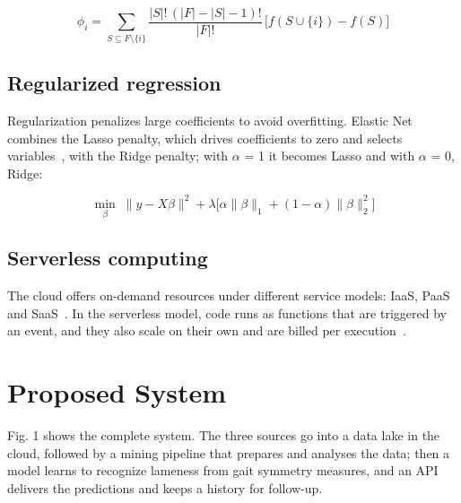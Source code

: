 \documentclass[conference,a4paper]{IEEEtran}
\begin{document}
\[
\phi_i = \sum_{S \subseteq F \setminus \{i\}} \frac{|S|!\,(|F|-|S|-1)!}{|F|!}\,\big[f(S \cup \{i\}) - f(S)\big]
\]

\subsection{Regularized regression}

Regularization penalizes large coefficients to avoid overfitting. Elastic Net~\cite{zou2005} combines the Lasso penalty, which drives coefficients to zero and selects variables~\cite{tibshirani1996}, with the Ridge penalty; with $\alpha$ = 1 it becomes Lasso and with $\alpha$ = 0, Ridge:

\[
\min_{\beta}\; \lVert y - X\beta \rVert^2 + \lambda \big[ \alpha \lVert\beta\rVert_1 + (1-\alpha) \lVert\beta\rVert_2^2 \big]
\]

\subsection{Serverless computing}

The cloud offers on-demand resources under different service models: IaaS, PaaS and SaaS~\cite{mell2011}. In the serverless model, code runs as functions that are triggered by an event, and they also scale on their own and are billed per execution~\cite{terraform}.

\section{Proposed System}

Fig. 1 shows the complete system. The three sources go into a data lake in the cloud, followed by a mining pipeline that prepares and analyses the data; then a model learns to recognize lameness from gait symmetry measures, and an API delivers the predictions and keeps a history for follow-up.
\end{document}
